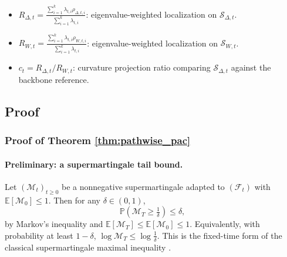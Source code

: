\documentclass{article}
\theoremstyle{plain}
\theoremstyle{definition}
\theoremstyle{remark}
\begin{document}
\begin{itemize}
\item $R_{\Delta,t}=\frac{\sum_{i=1}^k\lambda_{t,i}\rho_{\Delta,t,i}}{\sum_{i=1}^k\lambda_{t,i}}$: eigenvalue-weighted localization on $\mathcal S_{\Delta,t}$.
\item $R_{W,t}=\frac{\sum_{i=1}^k\lambda_{t,i}\rho_{W,t,i}}{\sum_{i=1}^k\lambda_{t,i}}$: eigenvalue-weighted localization on $\mathcal S_{W,t}$.
\item $c_t=R_{\Delta,t}/R_{W,t}$: curvature projection ratio comparing $\mathcal S_{\Delta,t}$ against the backbone reference. 
\end{itemize}


\subsection{Proof}

\subsubsection{Proof of Theorem \ref{thm:pathwise_pac}}
\label{proof:theorem all}

\paragraph{Preliminary: a supermartingale tail bound.}
Let $(\mathcal M_t)_{t\ge0}$ be a nonnegative supermartingale adapted to $(\mathcal F_t)$ with $\mathbb E[\mathcal M_0]\le 1$.
Then for any $\delta\in(0,1)$,
\[
\mathbb P\!\left(\mathcal M_T \ge \tfrac{1}{\delta}\right)
\le \delta,
\]
by Markov's inequality and $\mathbb E[\mathcal M_T]\le \mathbb E[\mathcal M_0]\le 1$.
Equivalently, with probability at least $1-\delta$, $\log \mathcal M_T \le \log \tfrac{1}{\delta}$.
This is the fixed-time form of the classical supermartingale maximal inequality  \citet{yangshuxue}.
\end{document}
